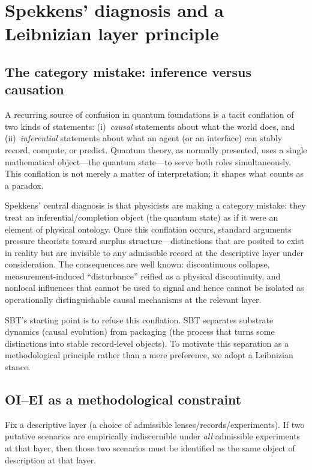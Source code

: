 \section{Spekkens' diagnosis and a Leibnizian layer principle}\label{sec:spekkens}

\subsection{The category mistake: inference versus causation}

A recurring source of confusion in quantum foundations is a tacit conflation of two kinds of statements:
(i)~\emph{causal} statements about what the world does, and
(ii)~\emph{inferential} statements about what an agent (or an interface) can stably record, compute, or predict.
Quantum theory, as normally presented, uses a single mathematical object---the quantum state---to serve both roles simultaneously. This conflation is not merely a matter of interpretation; it shapes what counts as a paradox.

Spekkens' central diagnosis is that physicists are making a category mistake: they treat an inferential/completion object (the quantum state) as if it were an element of physical ontology.\cite{Spekkens2007Toy} Once this conflation occurs, standard arguments pressure theorists toward surplus structure---distinctions that are posited to exist in reality but are invisible to any admissible record at the descriptive layer under consideration. The consequences are well known: discontinuous collapse, measurement-induced ``disturbance'' reified as a physical discontinuity, and nonlocal influences that cannot be used to signal and hence cannot be isolated as operationally distinguishable causal mechanisms at the relevant layer.

SBT's starting point is to refuse this conflation. SBT separates substrate dynamics (causal evolution) from packaging (the process that turns some distinctions into stable record-level objects). To motivate this separation as a methodological principle rather than a mere preference, we adopt a Leibnizian stance.

\subsection{OI--EI as a methodological constraint}

\begin{principle}
Fix a descriptive layer (a choice of admissible lenses/records/experiments). If two putative scenarios are empirically indiscernible under \emph{all} admissible experiments at that layer, then those two scenarios must be identified as the same object of description at that layer.
\end{principle}

